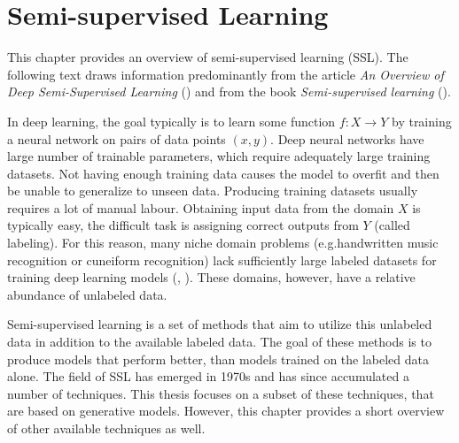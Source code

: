 \chapter{Semi-supervised Learning}
\label{chap:SemisupervisedLearning}


This chapter provides an overview of semi-supervised learning (SSL). The following text draws information predominantly from the article \emph{An Overview of Deep Semi-Supervised Learning} (\cite{SemisupervisedOverview}) and from the book \emph{Semi-supervised learning} (\cite{SslBook}).

In deep learning, the goal typically is to learn some function $f: X \rightarrow Y$ by training a neural network on pairs of data points $(x, y)$. Deep neural networks have large number of trainable parameters, which require adequately large training datasets. Not having enough training data causes the model to overfit and then be unable to generalize to unseen data. Producing training datasets usually requires a lot of manual labour. Obtaining input data from the domain $X$ is typically easy, the difficult task is assigning correct outputs from $Y$ (called labeling). For this reason, many niche domain problems (e.g.\@ handwritten music recognition or cuneiform recognition) lack sufficiently large labeled datasets for training deep learning models (\cite{MuscimaPP}, \cite{Cuneiforms}). These domains, however, have a relative abundance of unlabeled data.

Semi-supervised learning is a set of methods that aim to utilize this unlabeled data in addition to the available labeled data. The goal of these methods is to produce models that perform better, than models trained on the labeled data alone. The field of SSL has emerged in 1970s and has since accumulated a number of techniques. This thesis focuses on a subset of these techniques, that are based on generative models. However, this chapter provides a short overview of other available techniques as well.

